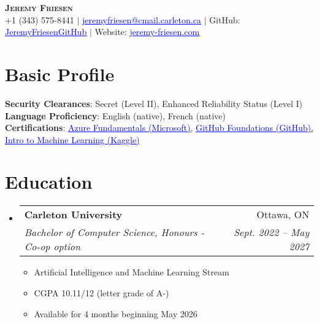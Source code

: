\documentclass[letterpaper,11pt]{article}
\makeatletter
\newcommand{\resumeItem}[1]{
  \item\small{
    {#1 \vspace{-2pt}}
  }
}
\newcommand{\resumeSubheading}[4]{
  \vspace{-2pt}\item
    \begin{tabular*}{0.97\textwidth}[t]{l@{\extracolsep{\fill}}r}
      \textbf{#1} & #2 \\
      \textit{\small#3} & \textit{\small #4} \\
    \end{tabular*}\vspace{-7pt}
}
\newcommand{\resumeSubHeadingListStart}{\begin{itemize}[leftmargin=0.15in, label={}]}
\newcommand{\resumeSubHeadingListEnd}{\end{itemize}}
\newcommand{\resumeItemListStart}{\begin{itemize}}
\newcommand{\resumeItemListEnd}{\end{itemize}\vspace{-5pt}}
\makeatother
\begin{document}

\begin{center}
    \textbf{\Huge \scshape Jeremy Friesen} \\ \vspace{5pt}
    \small +1 (343) 575-8441 $|$ 
    \href{mailto:jeremyfriesen@cmail.carleton.ca}{\textcolor{blue}{\underline{jeremyfriesen@cmail.carleton.ca}}} $|$ 
    GitHub: \href{https://github.com/JeremyFriesenGitHub}{\textcolor{blue}{\underline{JeremyFriesenGitHub}}}  $|$ 
    Website: \href{https://jeremy-friesen.com}{\textcolor{blue}{\underline{jeremy-friesen.com}}}
\end{center}


\section{Basic Profile}
 \begin{itemize}[leftmargin=0.15in, label={}]
    \small{\item{
    \textbf{Security Clearances}{: Secret (Level II), Enhanced Reliability Status (Level I)} \\
    \textbf{Language Proficiency}{: English (native), French (native)} \\
     \textbf{Certifications}{:
    \href{https://learn.microsoft.com/api/credentials/share/en-us/JeremyFriesen-3056/7578B454E676563E?sharingId=8B36EC9151BBF3F1}{\textcolor{blue}{\underline{Azure Fundamentals (Microsoft)}},}
    \href{https://www.credly.com/badges/aab96fc1-decd-4a72-a4af-bc3a9bd72279/public_url}{\textcolor{blue}{\underline{GitHub Foundations (GitHub)}},} 
    \href{https://www.kaggle.com/learn/certification/jeremyfriesen123/intro-to-machine-learning}{\textcolor{blue}{\underline{Intro to Machine Learning (Kaggle)}}}
     } \\
    }}
 \end{itemize}



\section{Education}
  \resumeSubHeadingListStart
    \resumeSubheading
      {Carleton University}{Ottawa, ON}
      {Bachelor of Computer Science, Honours - Co-op option}{Sept. 2022  -- May 2027}
    \resumeItemListStart
        \resumeItem{Artificial Intelligence and Machine Learning Stream}
        \resumeItem{CGPA 10.11/12 (letter grade of A-)}
        \resumeItem{Available for 4 months beginning May 2026}
    \resumeItemListEnd
  \resumeSubHeadingListEnd
\end{document}

